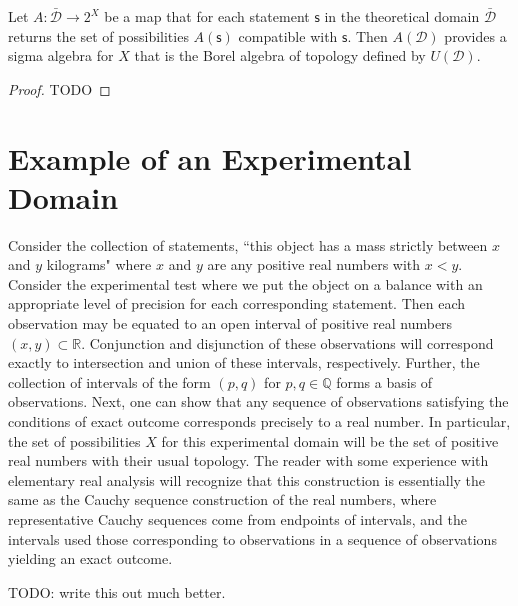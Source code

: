 \documentclass[11pt,letterpaper,fleqn]{memoir} %
\begin{document}
\begin{mathSection}
\begin{prop}
	Let $A : \bar{\mathcal{D}} \rightarrow 2^X$ be a map that for each statement $\mathsf{s}$ in the theoretical domain $\bar{\mathcal{D}}$ returns the set of possibilities $A(\mathsf{s})$ compatible with $\mathsf{s}$. Then $A(\mathcal{D})$ provides a sigma algebra for $X$ that is the Borel algebra of topology defined by $U(\mathcal{D})$.
\end{prop}

\begin{proof}
	TODO
\end{proof}

\end{mathSection}


\section{Example of an Experimental Domain}

Consider the collection of statements, ``this object has a mass strictly between $x$ and $y$ kilograms" where $x$ and $y$ are any positive real numbers with $x<y$. Consider the experimental test where we put the object on a balance with an appropriate level of precision for each corresponding statement. Then each observation may be equated to an open interval of positive real numbers $(x,y)\subset\mathbb{R}$. Conjunction and disjunction of these observations will correspond exactly to intersection and union of these intervals, respectively. Further, the collection of intervals of the form $(p,q)$ for $p,q\in\mathbb{Q}$ forms a basis of observations. Next, one can show that any sequence of observations satisfying the conditions of exact outcome corresponds precisely to a real number. In particular, the set of possibilities $X$ for this experimental domain will be the set of positive real numbers with their usual topology. The reader with some experience with elementary real analysis will recognize that this construction is essentially the same as the Cauchy sequence construction of the real numbers, where representative Cauchy sequences come from endpoints of intervals, and the intervals used those corresponding to observations in a sequence of observations yielding an exact outcome. 

TODO: write this out much better. 
\end{document}
